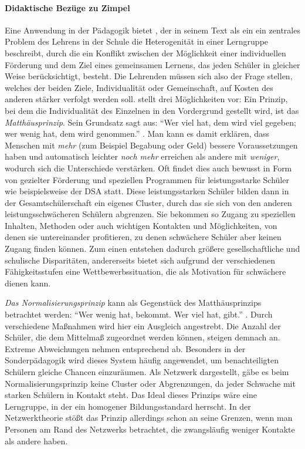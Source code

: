 \paragraph{Didaktische Bezüge zu Zimpel}

Eine Anwendung in der Pädagogik bietet \citeauthor{Zimpel2012}, der in seinem Text als ein ein zentrales Problem des Lehrens in der Schule die Heterogenität in einer Lerngruppe beschreibt, durch die ein Konflikt zwischen der Möglichkeit einer individuellen Förderung und dem Ziel eines gemeinsamen Lernens, das jeden Schüler in gleicher Weise berücksichtigt, besteht.
Die Lehrenden müssen sich also der Frage stellen, welches der beiden Ziele, Individualität oder Gemeinschaft, auf Kosten des anderen stärker verfolgt werden soll.
\citeauthor{Zimpel2012} stellt drei Möglichkeiten vor:
Ein Prinzip, bei dem die Individualität des Einzelnen in den Vordergrund gestellt wird, ist das \emph{Matthäusprinzip}.
Sein Grundsatz sagt aus: ``Wer viel hat, dem wird viel gegeben; wer wenig hat, dem wird genommen.'' \parencite[105]{Zimpel2012}.
Man kann es damit erklären, dass Menschen mit \emph{mehr} (zum Beispiel Begabung oder Geld) bessere Voraussetzungen haben und automatisch leichter \emph{noch mehr} erreichen als andere mit  \emph{weniger}, wodurch sich die Unterschiede verstärken.
Oft findet dies auch bewusst in Form von gezielter Förderung und speziellen Programmen für leistungsstarke Schüler wie beispielsweise der DSA statt.
Diese leistungsstarken Schüler bilden dann in der Gesamtschülerschaft ein eigenes Cluster, durch das sie sich von den anderen leistungsschwächeren Schülern abgrenzen. Sie bekommen so Zugang zu speziellen Inhalten, Methoden oder auch wichtigen Kontakten und Möglichkeiten, von denen sie untereinander profitieren, zu denen schwächere Schüler aber keinen Zugang finden können.
Zum einen entstehen dadurch größere gesellschaftliche und schulische Disparitäten, andererseits bietet sich aufgrund der verschiedenen Fähigkeitsstufen eine Wettbewerbssituation, die als Motivation für schwächere dienen kann.

\emph{Das Normalisierungsprinzip} kann als Gegenstück des Matthäusprinzips betrachtet werden: ``Wer wenig hat, bekommt. Wer viel hat, gibt.'' \parencite[12]{Zimpel2012}.
Durch verschiedene Maßnahmen wird hier ein Ausgleich angestrebt.
Die Anzahl der Schüler, die dem Mittelmaß zugeordnet werden können, steigen demnach an.
Extreme Abweichungen nehmen entsprechend ab.
Besonders in der Sonderpädagogik wird dieses System häufig angewendet, um benachteiligten Schülern gleiche Chancen einzuräumen.
Als Netzwerk dargestellt, gäbe es beim Normalisierungsprinzip keine Cluster oder Abgrenzungen, da jeder Schwache mit starken Schülern in Kontakt steht.
Das Ideal dieses Prinzips wäre eine Lerngruppe, in der ein homogener Bildungsstandard herrscht.
In der Netzwerktheorie stößt das Prinzip allerdings schon an seine Grenzen, wenn man Personen am Rand des Netzwerks betrachtet, die zwangsläufig weniger Kontakte als andere haben.

